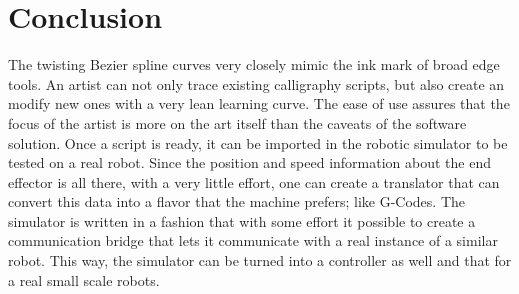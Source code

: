 \section{Conclusion} \label{Chapter:Conclusion}
{
    The twisting Bezier spline curves very closely mimic the ink mark of broad edge tools. An artist can not only trace existing calligraphy scripts, but also create an modify new ones with a very lean learning curve. The ease of use assures that the focus of the artist is more on the art itself than the caveats of the software solution. Once a script is ready, it can be imported in the robotic simulator to be tested on a real robot. Since the position and speed information about the end effector is all there, with a very little effort, one can create a translator that can convert this data into a flavor that the machine prefers; like G-Codes. The simulator is written in a fashion that with some effort it possible to create a communication bridge that lets it communicate with a real instance of a similar robot. This way, the simulator can be turned into a controller as well and that for a real small scale robots.
}
\clearpage